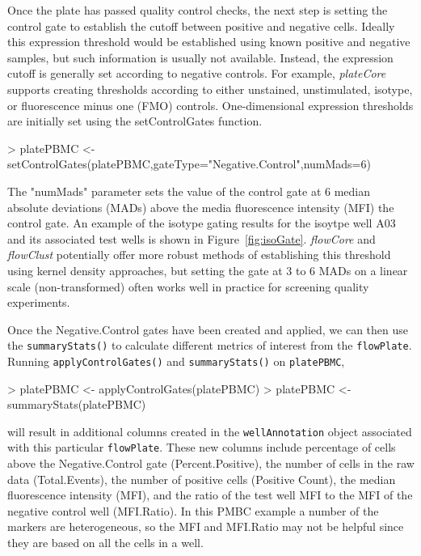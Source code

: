 \documentclass[12pt]{article}
\newcommand{\Rfunction}[1]{{\texttt{#1()}}}
\newcommand{\Rclass}[1]{{\texttt{#1}}}
\newcommand{\Robject}[1]{{\texttt{#1}}}
\newcommand{\Rpackage}[1]{{\textit{#1}}}
\begin{document}
\clearpage
Once the plate has passed quality control
checks, the next step is setting the control gate to establish the cutoff between positive and negative cells.
Ideally this expression threshold would be established using known positive and negative samples, but such information is
usually not available. Instead, the expression cutoff is generally set according to negative controls. 
For example, \Rpackage{plateCore} supports creating thresholds according to either unstained, unstimulated, isotype, 
or fluorescence minus one (FMO) controls. One-dimensional expression thresholds are initially set using
the setControlGates function. 
\begin{Schunk}
\begin{Sinput}
> platePBMC <- setControlGates(platePBMC,gateType="Negative.Control",numMads=6)
\end{Sinput}
\end{Schunk}
The "numMads" parameter sets the value of the control gate at 6 median absolute deviations (MADs) above 
the media fluorescence intensity (MFI) the control gate. An example of the isotype gating results for the isoytpe well A03 and its
associated test wells is shown in Figure~\ref{fig:isoGate}.
\Rpackage{flowCore} and \Rpackage{flowClust} potentially offer
more robust methods of establishing this threshold using kernel density approaches, but setting the
gate at 3 to 6 MADs on a linear scale (non-transformed) often works well in practice for screening quality experiments.

Once the Negative.Control gates have been created and applied, we can then use the \Rfunction{summaryStats} to calculate different
metrics of interest from the \Rclass{flowPlate}. Running \Rfunction{applyControlGates} and \Rfunction{summaryStats} on \Robject{platePBMC}, 
\begin{Schunk}
\begin{Sinput}
> platePBMC <- applyControlGates(platePBMC)
> platePBMC <- summaryStats(platePBMC)
\end{Sinput}
\end{Schunk}
will result in additional columns created in the \Robject{wellAnnotation} object associated with this
particular \Robject{flowPlate}.  
These new columns include percentage of cells above the Negative.Control gate (Percent.Positive),
the number of cells in the raw data (Total.Events), the number of positive cells (Positive Count),
the median fluorescence intensity (MFI), and the ratio of the test well MFI to the MFI of the negative
control well (MFI.Ratio). In this PMBC example a number of the markers are heterogeneous, so the MFI and MFI.Ratio
may not be helpful since they are based on all the cells in a well.
\end{document}
